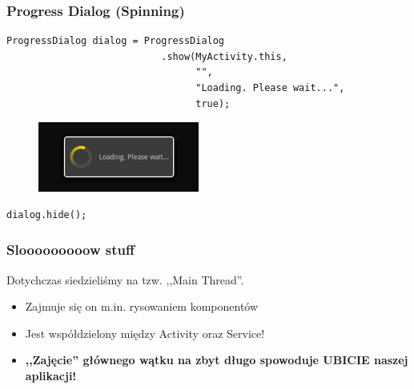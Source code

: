 % 

\begin{frame}[fragile]\frametitle{Progress Dialog (Spinning)}
\begin{lstlisting}
ProgressDialog dialog = ProgressDialog
                           .show(MyActivity.this, 
                                 "", 
                                 "Loading. Please wait...", 
                                 true);
\end{lstlisting}

\begin{figure}
 \centering
 \includegraphics[width=.5\textwidth]{images/dialog_progress_spinning}
\end{figure}

\pause

\begin{lstlisting}
dialog.hide();
\end{lstlisting}
\end{frame}

\begin{frame}\frametitle{Slooooooooow stuff}
Dotychczas siedzieliśmy na tzw. ,,Main Thread''.
\begin{itemize}
 \item Zajmuje się on m.in. rysowaniem komponentów
 \item Jest współdzielony między Activity oraz Service!
 \item \textbf{,,Zajęcie'' głównego wątku na zbyt długo spowoduje UBICIE naszej aplikacji!}
\end{itemize}
\end{frame}

